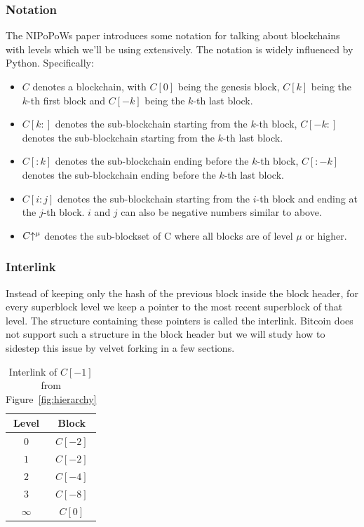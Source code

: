 \documentclass[11pt]{llncs}
\begin{document}
\subsubsection{Notation}
The NIPoPoWs paper introduces some notation for talking about blockchains with levels which we'll be using extensively. The notation is widely influenced by Python. Specifically:

\begin{itemize}
  \item $C$ denotes a blockchain, with $C[0]$ being the genesis block, $C[k]$ being the $k$-th first block and $C[-k]$ being the $k$-th last block.
  \item $C[k:]$ denotes the sub-blockchain starting from the $k$-th block, $C[-k:]$ denotes the sub-blockchain starting from the $k$-th last block.
  \item $C[:k]$ denotes the sub-blockchain ending before the $k$-th block, $C[:-k]$ denotes the sub-blockchain ending before the $k$-th last block.
  \item $C[i:j]$ denotes the sub-blockchain starting from the $i$-th block and ending at the $j$-th block. $i$ and $j$ can also be negative numbers similar to above.
  \item $C\negthickspace\uparrow^\mu$ denotes the sub-blockset of C where all blocks are of level $\mu$ or higher.
\end{itemize}

\subsubsection{Interlink}
Instead of keeping only the hash of the previous block inside the block header,
for every superblock level we keep a pointer to the most recent superblock of that level. The structure
containing these pointers is called the interlink. Bitcoin does not support
such a structure in the block header but we will study how to sidestep this
issue by velvet forking in a few sections.

\begin{table}
  \centering
  \begin{tabular}{|c|c|}
    \hline
    Level & Block \\
    \hline
    $0$ & $C[-2]$ \\
    $1$ & $C[-2]$ \\
    $2$ & $C[-4]$ \\
    $3$ & $C[-8]$ \\
    $\infty$ & $C[0]$ \\
    \hline
  \end{tabular}
  \caption{Interlink of $C[-1]$ from Figure~\ref{fig:hierarchy}}
  \label{table:interlink-example}
\end{table}
\end{document}
